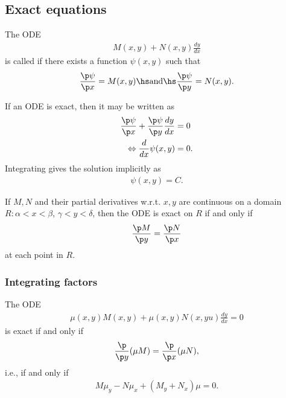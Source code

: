\documentclass{article}
\begin{document}
\subsection{Exact equations}


\begin{definition}
    The ODE
    \begin{align*}
        M(x,y)+N(x,y)\frac{dy}{dx}
    \end{align*}
    is called  if there exists a function $\psi(x,y)$ such that
    \begin{align*}
        \frac{\p \psi}{\p x}=M(x,y)\hs\text{and}\hs\frac{\p\psi}{\p y}=N(x,y).
    \end{align*}
\end{definition}

\begin{theorem}
    If an ODE is exact, then it may be written as
    \begin{align*}
        \frac{\p\psi}{\p x}+\frac{\p\psi}{\p y}\frac{dy}{dx}&=0\\
        \Leftrightarrow \frac{d}{dx}\psi(x,y)&=0.
    \end{align*}
    Integrating gives the solution implicitly as
    \begin{align*}
        \psi(x,y)=C.
    \end{align*}
\end{theorem}

\begin{theorem}
    If $M,N$ and their partial derivatives w.r.t. $x,y$ are continuous
    on a domain $R:\alpha<x<\beta$, $\gamma<y<\delta$, then the ODE is
    exact on $R$ if and only if
    \begin{align*}
        \frac{\p M}{\p y}=\frac{\p N}{\p x}
    \end{align*}
    at each point in $R$.
\end{theorem}


\subsubsection{Integrating factors}


\begin{theorem}
    The ODE
    \begin{align*}
        \mu(x,y)M(x,y)+\mu(x,y)N(x,yu)\frac{dy}{dx}=0
    \end{align*}
    is exact if and only if
    \begin{align*}
        \frac{\p}{\p y}(\mu M)=\frac{\p}{\p x}(\mu N),
    \end{align*}
    i.e., if and only if
    \begin{align*}
        M\mu_y - N\mu_x + (M_y + N_x)\mu = 0.
    \end{align*}
\end{theorem}
\end{document}
